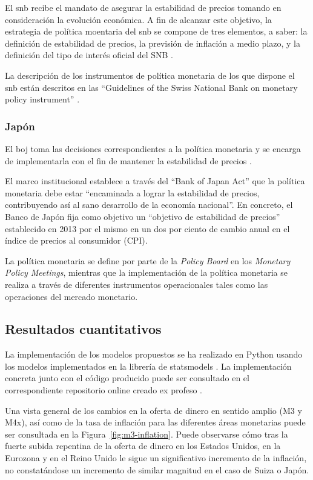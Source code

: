 \documentclass[titlepage, 12pt]{article}
\begin{document}
El \acrfull{snb} recibe el mandato de asegurar la estabilidad de precios tomando en consideración la evolución económica. A fin de alcanzar este objetivo, la estrategia de política moentaria del \acrshort{snb} se compone de tres elementos, a saber: la definición de estabilidad de precios, la previsión de inflación a medio plazo, y la definición del tipo de interés oficial del SNB \autocite{snb2024a}.

La descripción de los instrumentos de política monetaria de los que dispone el \acrshort{snb} están descritos en las \enquote{Guidelines of the Swiss National Bank on monetary policy instrument} \autocite{snb2024b}.

\subsubsection{Japón}
El \acrfull{boj} toma las decisiones correspondientes a la política monetaria y se encarga de implementarla con el fin de mantener la estabilidad de precios \autocite{boj2024a}.

El marco institucional establece a través del \enquote{Bank of Japan Act} que la política monetaria debe estar \enquote{encaminada a lograr la estabilidad de precios, contribuyendo así al sano desarrollo de la economía nacional}. En concreto, el Banco de Japón fija como objetivo un \enquote{objetivo de estabilidad de precios} establecido en 2013 por el mismo en un dos por ciento de cambio anual en el índice de precios al consumidor (CPI).

La política monetaria se define por parte de la \textit{Policy Board} en los \textit{Monetary Policy Meetings}, mientras que la implementación de la política monetaria se realiza a través de diferentes instrumentos operacionales tales como las operaciones del mercado monetario.

\subsection{Resultados cuantitativos}
La implementación de los modelos propuestos se ha realizado en Python usando los modelos implementados en la librería de statsmodels \autocite{statsmodels2024a}. La implementación concreta junto con el código producido puede ser consultado en el correspondiente repositorio online creado ex profeso \autocite{github2024}.

Una vista general de los cambios en la oferta de dinero en sentido amplio (M3 y M4x), así como de la tasa de inflación para las diferentes áreas monetarias puede ser consultada en la Figura~\ref{fig:m3-inflation}. Puede observarse cómo tras la fuerte subida repentina de la oferta de dinero en los Estados Unidos, en la Eurozona y en el Reino Unido le sigue un significativo incremento de la inflación, no constatándose un incremento de similar magnitud en el caso de Suiza o Japón.
\end{document}
